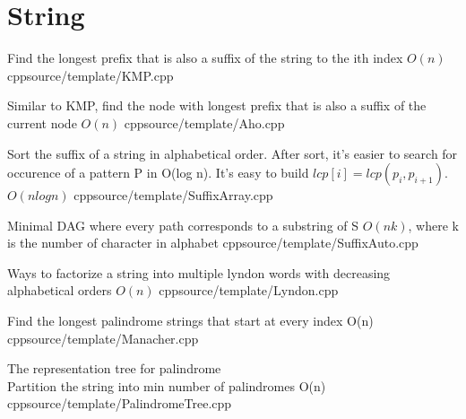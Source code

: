 \section{String}

{Find the longest prefix that is also a suffix of the string to the ith index}
{$O(n)$}
{cpp}{source/template/KMP.cpp}


{Similar to KMP, find the node with longest prefix that is also a suffix of the current node}
{$O(n)$}
{cpp}{source/template/Aho.cpp}
% 

{Sort the suffix of a string in alphabetical order. After sort, it's easier to search for occurence of a pattern P in O(log n). It's easy to build $lcp[i] = lcp(p_i, p_{i+1})$.}
{$O(n log n)$}
{cpp}{source/template/SuffixArray.cpp}


{Minimal DAG where every path corresponds to a substring of S}
{$O(nk)$, where k is the number of character in alphabet}
{cpp}{source/template/SuffixAuto.cpp}


{Ways to factorize a string into multiple lyndon words with decreasing alphabetical orders}
{$O(n)$}
{cpp}{source/template/Lyndon.cpp}


{Find the longest palindrome strings that start at every index}
{O(n)}
{cpp}{source/template/Manacher.cpp}


{The representation tree for palindrome \\
 Partition the string into min number of palindromes}
{O(n)}
{cpp}{source/template/PalindromeTree.cpp}
